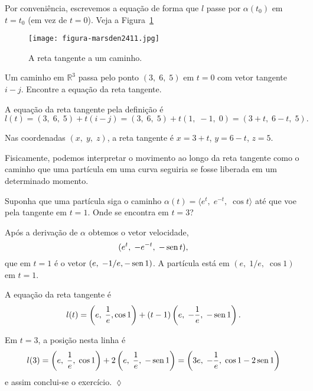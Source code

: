 Por conveniência, escrevemos a equação de forma que \(l\) passe por \(\alpha(t_{0})\) em \(t = t_{0}\) (em vez de \(t = 0\)). Veja a Figura~\ref{fig:2411}

\begin{figure}[H]
  \centering
  \texttt{[image: figura-marsden2411.jpg]}
  \caption{A reta tangente a um caminho.}\label{fig:2411}
\end{figure}

\begin{exc}\label{exer:1-07}
Um caminho em \(\mathbb{R}^{3}\) passa pelo ponto \((3,\; 6,\; 5)\) em \(t = 0\) com vetor tangente \(i -j\). Encontre a equação da reta tangente.
\end{exc}

\solo A equação da reta tangente pela definição é
\begin{equation*}
l(t) = (3,\; 6,\; 5) + t(i - j) = (3,\; 6,\; 5) + t (1,\; -1,\; 0) = (3 + t,\; 6 - t,\; 5).
\end{equation*}

Nas coordenadas \((x,\; y,\; z)\), a reta tangente é \(x = 3 + t\), \(y = 6 - t\), \(z = 5\).

Fisicamente, podemos interpretar o movimento ao longo da reta tangente como o caminho que uma partícula em uma curva seguiria se fosse liberada em um determinado momento.

\begin{exc}\label{exer:1-08}
Suponha que uma partícula siga o caminho \(\alpha(t)=\langle e^{t},\; e^{-t},\; \cos t\rangle \) até que voe pela tangente em \(t=1\). Onde se encontra em \(t=3\)?
\end{exc}

\solo Após a derivação de \(\alpha\) obtemos o vetor velocidade,
\begin{equation*}
(e^{t}, \; -e^{-t},\;  -\operatorname{sen} t),
\end{equation*}
que em \(t = 1\) é o vetor \((e,\; -1/e, -\operatorname{sen} 1)\). A partícula está em \((e,\; 1/e,\; \cos 1)\) em \(t=1\).

A equação da reta tangente é
\begin{equation*}
l(t) = \left(e,\; \frac{1}{e}, \cos 1\right) + (t - 1) \left(e,\; -\frac{1}{e},\; -\operatorname{sen} 1\right).
\end{equation*}

Em \(t = 3\), a posição nesta linha é
\begin{equation*}
l(3)=\left(e,\; \dfrac{1}{e},\; \cos 1 \right)+2\left( e,\; \dfrac{1}{e},\; -\operatorname{sen} 1 \right)=\left(3e,\;-\frac{1}{e}, \; \cos 1-2\operatorname{sen} 1  \right)
\end{equation*}
e assim conclui-se o exercício. \hfill $\lozenge$


